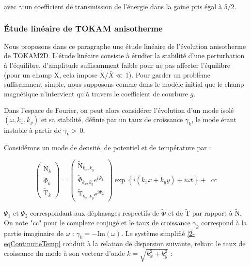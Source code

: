 \begin{refsection}

avec $\gamma$ un coefficient de transmission de l'énergie dans la gaine pris
égal à 5/2.

\subsubsection{Étude linéaire de TOKAM anisotherme}
Nous proposons dans ce paragraphe une étude linéaire de l'évolution anisotherme
de TOKAM2D. L'étude linéaire consiste à étudier la stabilité d'une perturbation à
l'équilibre, d'amplitude suffisamment faible pour ne pas affecter l'équilibre
(pour un champ ${\text{X}}$, cela impose
$\widetilde{\text{X}}/\overbar{X}\ll\,$1).
Pour garder un problème suffisamment simple, nous supposons comme dans le modèle
initial que le champ magnétique n'intervient qu'à travers le coefficient de
courbure $g$.

Dans l'espace de Fourier, on peut alors considérer l'évolution d'un mode isolé
$(\omega, k_x, k_y)$ et sa stabilité, définie par un taux de croissance
$\gamma_k$, le mode étant instable à partir de $\gamma_k>\,$0.

Considérons un mode de densité, de potentiel et de température par :

\begin{equation}
\begin{pmatrix}
\widetilde{\text{N}}_k\\\widetilde{\Phi}_k\\\widetilde{\text{T}}_k
\end{pmatrix}=
\begin{pmatrix}
\widetilde{\text{N}}_{k_x,k_y}\\\widetilde{\Phi}_{k_x,k_y}e^{i\Psi_1}\\\widetilde{\text{T}}_{k_x,k_y}e^{i\Psi_2}
\end{pmatrix}\exp\left\{i(k_xx+k_yy)+i\omega t\right\}+\;\;\text{cc}
\end{equation}

$\Psi_1$ et $\Psi_2$ correspondant aux déphasages respectifs de
$\widetilde{\Phi}$ et de $\widetilde{\text{T}}$ par rapport à
$\widetilde{\text{N}}$. On note "$\text{cc}$" pour le complexe conjugé et
le taux de croissance $\gamma_k$ correspond à la partie imaginaire de $\omega$
: $\gamma_k=-\text{Im}(\omega)$.
Le système simplifié \eqref{2-eqContinuiteTemp} conduit à la relation de dispersion
suivante, reliant le taux de croissance du mode à son vecteur d'onde
$k=\sqrt{k_x^2+k_y^2}$ :


\end{refsection}
